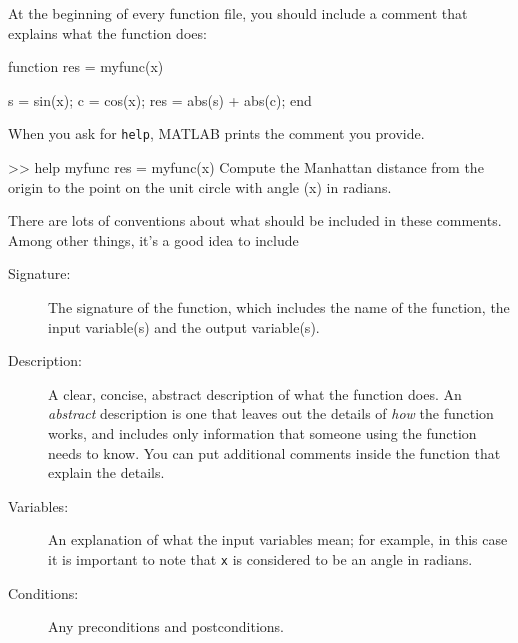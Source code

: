 
At the beginning of every function file, you should include a comment
that explains what the function does:


\begin{code}

function res = myfunc(x)

    s = sin(x);
    c = cos(x);
    res = abs(s) + abs(c);
end
\end{code}

When you ask for {\tt help}, MATLAB prints the comment you provide.


\begin{code}
>> help myfunc
  res = myfunc(x)
  Compute the Manhattan distance from the origin to the
  point on the unit circle with angle (x) in radians.
\end{code}

There are lots of conventions about what should be included
in these comments.  Among other things, it's a good idea to
include

\begin{description}

\item [Signature:] The signature of the function, which includes the name
of the function, the input variable(s) and the output variable(s).

\item [Description:] A clear, concise, abstract description of what the function does.
An {\em abstract} description is one that leaves out the
details of {\em how} the function works, and includes only information
that someone using the function needs to know.  You can put additional
comments inside the function that explain the details.

\item [Variables:] An explanation of what the input variables mean; for example,
in this case it is important to note that {\tt x} is considered
to be an angle in radians.

\item [Conditions:] Any preconditions and postconditions.

\end{description}

